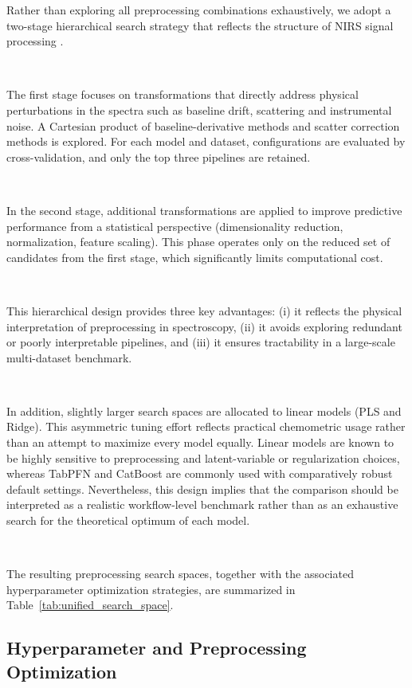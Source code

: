 \documentclass{article}
\begin{document}
Rather than exploring all preprocessing combinations exhaustively, we adopt a two-stage hierarchical search strategy that reflects the structure of NIRS signal processing \cite{Rinnan2009Preprocessing}.

~

The first stage focuses on transformations that directly address physical perturbations in the spectra such as baseline drift, scattering and instrumental noise. A Cartesian product of baseline-derivative methods and scatter correction methods is explored. For each model and dataset, configurations are evaluated by cross-validation, and only the top three pipelines are retained.

~

In the second stage, additional transformations are applied to improve predictive performance from a statistical perspective (dimensionality reduction, normalization, feature scaling). This phase operates only on the reduced set of candidates from the first stage, which significantly limits computational cost.

~

This hierarchical design provides three key advantages: (i) it reflects the physical interpretation of preprocessing in spectroscopy, (ii) it avoids exploring redundant or poorly interpretable pipelines, and (iii) it ensures tractability in a large-scale multi-dataset benchmark.

~

In addition, slightly larger search spaces are allocated to linear models (PLS and Ridge). This asymmetric tuning effort reflects practical chemometric usage rather than an attempt to maximize every model equally. Linear models are known to be highly sensitive to preprocessing and latent-variable or regularization choices, whereas TabPFN and CatBoost are commonly used with comparatively robust default settings. Nevertheless, this design implies that the comparison should be interpreted as a realistic workflow-level benchmark rather than as an exhaustive search for the theoretical optimum of each model.

~

The resulting preprocessing search spaces, together with the associated hyperparameter optimization strategies, are summarized in Table~\ref{tab:unified_search_space}.





\subsection{Hyperparameter and Preprocessing Optimization}
\end{document}

